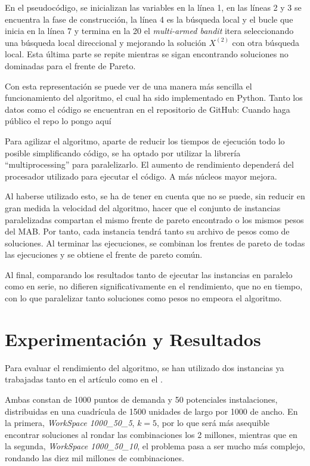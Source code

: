 \documentclass[12pt,a4paper]{book}
\begin{document}
En el pseudocódigo, se inicializan las variables en la línea 1, en las líneas 2 y 3 se encuentra la fase de construcción, la línea 4
es la búsqueda local y el bucle que inicia en la línea 7 y termina en la 20 el \textit{multi-armed bandit} itera seleccionando una búsqueda local direccional
y mejorando la solución $X^{(2)}$ con otra búsqueda local. Esta última parte se repite mientras se sigan encontrando soluciones no dominadas para el frente de Pareto.


Con esta representación se puede ver de una manera más sencilla el funcionamiento del algoritmo, el cual ha sido implementado en Python. Tanto los datos como el código se encuentran en el repositorio de GitHub: \color{red}Cuando haga público el repo lo pongo aquí \color{black}

Para agilizar el algoritmo, aparte de reducir los tiempos de ejecución todo lo posible simplificando código, se ha optado por utilizar la librería ``multiprocessing'' para paralelizarlo.
El aumento de rendimiento dependerá del procesador utilizado para ejecutar el código. A más núcleos mayor mejora.

Al haberse utilizado esto, se ha de tener en cuenta que no se puede, sin reducir en gran medida la velocidad del algoritmo, hacer que el conjunto de instancias paralelizadas compartan
el mismo frente de pareto encontrado o los mismos pesos del MAB. Por tanto, cada instancia tendrá tanto su archivo de pesos como de soluciones. Al terminar las ejecuciones, se combinan los frentes de pareto de 
todas las ejecuciones y se obtiene el frente de pareto común.

Al final, comparando los resultados tanto de ejecutar las instancias en paralelo como en serie, no difieren significativamente en el rendimiento, que no en tiempo, con lo que paralelizar tanto soluciones como pesos no empeora 
el algoritmo.

\chapter{Experimentación y Resultados}

Para evaluar el rendimiento del algoritmo, se han utilizado dos instancias ya trabajadas tanto en el artículo \cite{k-balanced_1} como en el \cite{k-Balanced_2}. 

Ambas constan de 1000 puntos de demanda y 50 potenciales instalaciones, distribuidas en una cuadrícula de 1500 unidades de largo por 1000 de ancho.
En la primera, \textit{WorkSpace 1000\_50\_5}, $k=5$, por lo que será más asequible encontrar soluciones al rondar las combinaciones los 2 millones, mientras que en la segunda, \textit{WorkSpace 1000\_50\_10}, el problema pasa a ser mucho más complejo, rondando las diez mil millones de combinaciones.
\end{document}
